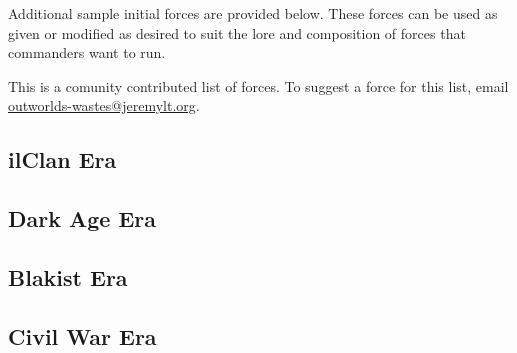 Additional sample initial forces are provided below.
These forces can be used as given or modified as desired to suit the lore and composition of forces that commanders want to run.

This is a comunity contributed list of forces.
To suggest a force for this list, email \href{mailto:outworlds-wastes@jeremylt.org}{outworlds-wastes@jeremylt.org}.

\subsection{ilClan Era}





\subsection{Dark Age Era}



\subsection{Blakist Era}





\subsection{Civil War Era}





